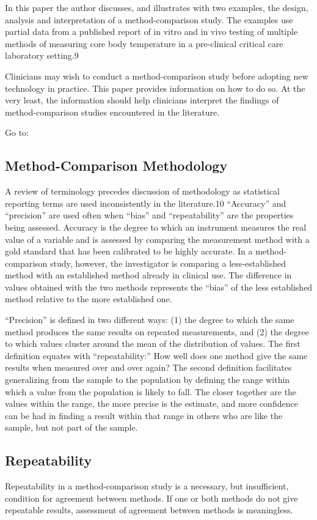 \documentclass[]{article}
\begin{document}
In this paper the author discusses, and illustrates with two examples, the design, analysis and interpretation of a method-comparison study. The examples use partial data from a published report of in vitro and in vivo testing of multiple methods of measuring core body temperature in a pre-clinical critical care laboratory setting.9

Clinicians may wish to conduct a method-comparison study before adopting new technology in practice. This paper provides information on how to do so. At the very least, the information should help clinicians interpret the findings of method-comparison studies encountered in the literature.

Go to:
\subsection*{Method-Comparison Methodology}
A review of terminology precedes discussion of methodology as statistical reporting terms are used inconsistently in the literature.10 “Accuracy” and “precision” are used often when “bias” and “repeatability” are the properties being assessed. Accuracy is the degree to which an instrument measures the real value of a variable and is assessed by comparing the measurement method with a gold standard that has been calibrated to be highly accurate. In a method-comparison study, however, the investigator is comparing a less-established method with an established method already in clinical use. The difference in values obtained with the two methods represents the “bias” of the less established method relative to the more established one.

“Precision” is defined in two different ways: (1) the degree to which the same method produces the same results on repeated measurements, and (2) the degree to which values cluster around the mean of the distribution of values. The first definition equates with “repeatability:” How well does one method give the same results when measured over and over again? The second definition facilitates generalizing from the sample to the population by defining the range within which a value from the population is likely to fall. The closer together are the values within the range, the more precise is the estimate, and more confidence can be had in finding a result within that range in others who are like the sample, but not part of the sample.

\subsection*{Repeatability}
Repeatability in a method-comparison study is a necessary, but insufficient, condition for agreement between methods. If one or both methods do not give repeatable results, assessment of agreement between methods is meaningless.
\end{document}
